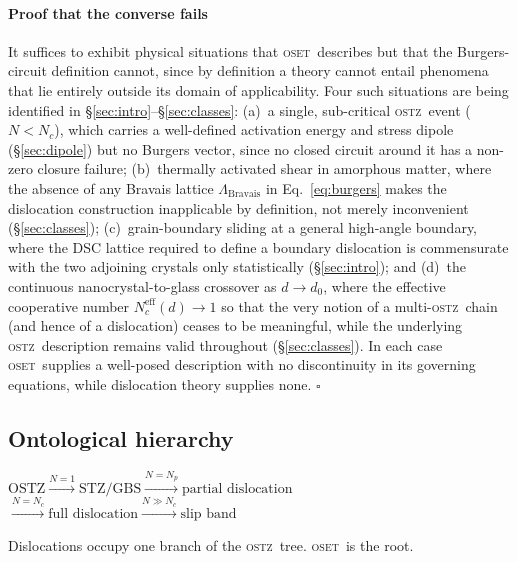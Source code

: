 \documentclass[3p]{elsarticle}
\newcommand{\OSTZ}{\textsc{ostz}}
\newcommand{\OSET}{\textsc{oset}}
\begin{document}
\paragraph{Proof that the converse fails} It suffices to exhibit
physical situations that \OSET\ describes but that the
Burgers-circuit definition cannot, since by definition a theory
cannot entail phenomena that lie entirely outside its domain of
applicability. Four such situations are being identified in
\S\ref{sec:intro}--\S\ref{sec:classes}: (a)~a single, sub-critical
\OSTZ\ event ($N<N_c$), which carries a well-defined activation
energy and stress dipole (\S\ref{sec:dipole}) but no Burgers vector,
since no closed circuit around it has a non-zero closure failure;
(b)~thermally activated shear in amorphous matter, where the
absence of any Bravais lattice $\Lambda_\mathrm{Bravais}$ in
Eq.~\eqref{eq:burgers} makes the dislocation construction
inapplicable by definition, not merely inconvenient
(\S\ref{sec:classes}); (c)~grain-boundary sliding at a general
high-angle boundary, where the DSC lattice required to define a
boundary dislocation is commensurate with the two adjoining crystals
only statistically (\S\ref{sec:intro}); and (d)~the continuous
nanocrystal-to-glass crossover as $d\to d_0$, where the effective
cooperative number $N_c^\text{eff}(d)\to1$ so that the very notion of
a multi-\OSTZ\ chain (and hence of a dislocation) ceases to be
meaningful, while the underlying \OSTZ\ description remains valid
throughout (\S\ref{sec:classes}). In each case \OSET\ supplies a
well-posed description with no discontinuity in its governing
equations, while dislocation theory supplies none. $\square$

\subsection{Ontological hierarchy}

\begin{center}
\small
$\text{OSTZ}
\xrightarrow{N=1}\text{STZ/GBS}
\xrightarrow{N=N_p}\text{partial dislocation}$\\[3pt]
$\xrightarrow{N=N_c}\text{full dislocation}
\xrightarrow{N\gg N_c}\text{slip band}$
\end{center}

Dislocations occupy one branch of the \OSTZ\ tree. \OSET\ is the root.
\end{document}
